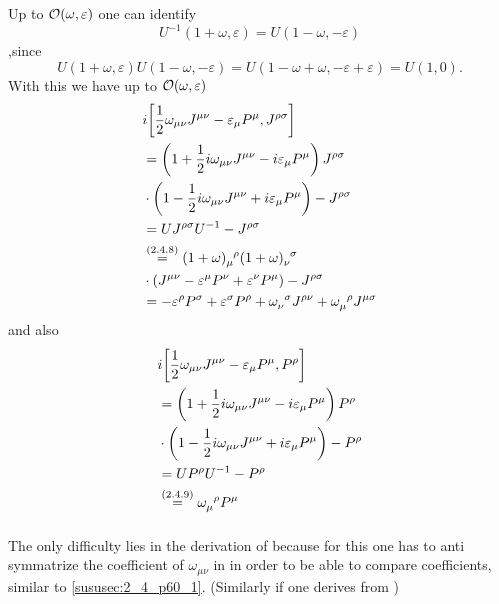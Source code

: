 \subsubsection{ }
Up to $\order{\omega,\varepsilon}$ one can identify \[U^{-1}(1+\omega,\varepsilon)=U(1-\omega,-\varepsilon)\],since \[U(1+\omega,\varepsilon)U(1-\omega,-\varepsilon)=U(1-\omega+\omega,-\varepsilon+\varepsilon)=U(1,0).\]
With this we have up to $\order{\omega,\varepsilon}$
\begin{align*} 
	&i\commutator{\dfrac{1}{2}\omega_{\mu \nu}J^{\mu\nu}-\varepsilon_\mu P^\mu}{J^{\rho\sigma}}\\
	&=\left(1+\dfrac{1}{2}i\omega_{\mu \nu}J^{\mu\nu}-i\varepsilon_\mu P^\mu\right)J^{\rho\sigma}\\
	&\cdot\left(1-\dfrac{1}{2}i\omega_{\mu \nu}J^{\mu\nu}+i\varepsilon_\mu P^\mu\right)-J^{\rho\sigma}\\
	&=U J^{\rho\sigma}U^{-1}-J^{\rho\sigma}\\
	&\overset{\eqc{2.4.8}}{=}(1+\omega)_\mu^{\hphantom{\mu}\rho}(1+\omega)_\nu^{\hphantom{\nu}\sigma}\\
	&\cdot\left(J^{\mu \nu}-\varepsilon^\mu P^\nu+\varepsilon^\nu P^\mu\right)-J^{\rho\sigma}\\
	&=-\varepsilon^\rho P^\sigma+\varepsilon^\sigma P^\rho+\omega_\nu^{\hphantom{\nu}\sigma}J^{\rho \nu}+\omega_\mu^{\hphantom{\mu}\rho}J^{\mu \sigma}
\end{align*}
and also
\begin{align*} 
	&i\commutator{\dfrac{1}{2}\omega_{\mu \nu}J^{\mu\nu}-\varepsilon_\mu P^\mu}{P^{\rho}}\\
	&=\left(1+\dfrac{1}{2}i\omega_{\mu \nu}J^{\mu\nu}-i\varepsilon_\mu P^\mu\right)P^{\rho}\\
	&\cdot\left(1-\dfrac{1}{2}i\omega_{\mu \nu}J^{\mu\nu}+i\varepsilon_\mu P^\mu\right)-P^{\rho}\\
	&=U P^{\rho}U^{-1}-P^{\rho}\\
	&\overset{\eqc{2.4.9}}{=}\omega_\mu^{\hphantom{\mu}\rho}P^\mu
\end{align*}
\subsubsection{ }
The only difficulty lies in the derivation of  because for this one has to anti symmatrize the coefficient of $\omega_{\mu \nu}$ in  in order to be able to compare coefficients, similar to \ref{sususec:2_4_p60_1}. (Similarly if one derives  from )

